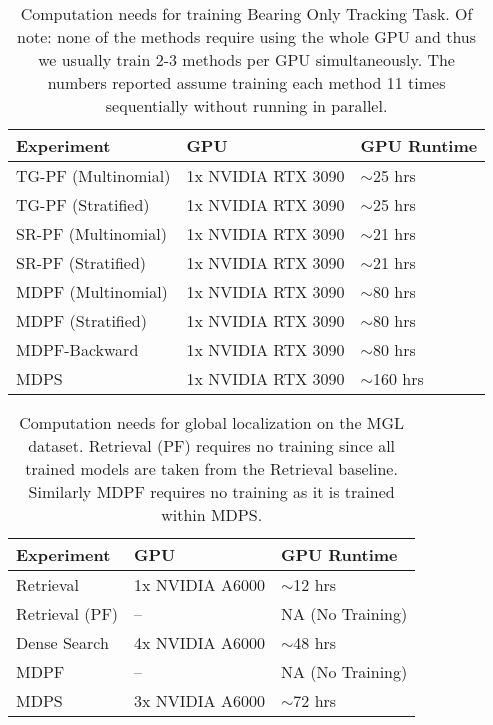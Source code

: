     \begin{table}[ht]
    \centering
    \caption{Computation needs for training Bearing Only Tracking Task. Of note: none of the methods require using the whole GPU and thus we usually train 2-3 methods per GPU simultaneously. The numbers reported assume training each method 11 times sequentially without running in parallel.}
    \label{appx_tab:bearings_only_compute}
    \begin{tabular}{lll}
    \hline
    Experiment          & GPU                      & GPU Runtime  \\ \hline
    TG-PF (Multinomial) & 1x NVIDIA RTX 3090       & $\sim$25 hrs \\
    TG-PF (Stratified)  & 1x NVIDIA RTX 3090       & $\sim$25 hrs \\
    SR-PF (Multinomial) & 1x NVIDIA RTX 3090       & $\sim$21 hrs \\
    SR-PF (Stratified)  & 1x NVIDIA RTX 3090       & $\sim$21 hrs \\
    MDPF (Multinomial)  & 1x NVIDIA RTX 3090       & $\sim$80 hrs \\
    MDPF (Stratified)   & 1x NVIDIA RTX 3090       & $\sim$80 hrs \\
    MDPF-Backward       & 1x NVIDIA RTX 3090       & $\sim$80 hrs \\
    MDPS                & 1x NVIDIA RTX 3090       & $\sim$160 hrs \\ \hline
    \end{tabular}
    \end{table}



    \begin{table}[ht]
    \centering
    \caption{Computation needs for global localization on the MGL dataset. Retrieval (PF) requires no training since all trained models are taken from the Retrieval baseline.  Similarly MDPF requires no training as it is trained within MDPS.}
    \label{appx_tab:mapillary_compute}
    \begin{tabular}{lll}
    \hline
    Experiment          & GPU                          & GPU Runtime  \\ \hline
    Retrieval           & 1x NVIDIA A6000              & $\sim$12 hrs \\
    Retrieval (PF)      & --                           & NA (No Training) \\
    Dense Search        & 4x NVIDIA A6000              & $\sim$48 hrs \\
    MDPF                & --                           & NA (No Training) \\
    MDPS                & 3x NVIDIA A6000              & $\sim$72 hrs \\ \hline
    \end{tabular}
    \end{table}



